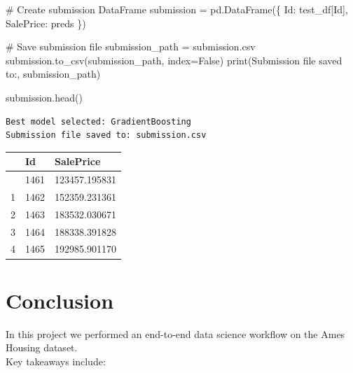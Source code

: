 \documentclass[
]{article}
\newenvironment{Shaded}{\begin{snugshade}}{\end{snugshade}}
\newcommand{\BuiltInTok}[1]{\textcolor[rgb]{0.00,0.23,0.31}{#1}}
\newcommand{\CommentTok}[1]{\textcolor[rgb]{0.37,0.37,0.37}{#1}}
\newcommand{\NormalTok}[1]{\textcolor[rgb]{0.00,0.23,0.31}{#1}}
\newcommand{\OperatorTok}[1]{\textcolor[rgb]{0.37,0.37,0.37}{#1}}
\newcommand{\StringTok}[1]{\textcolor[rgb]{0.13,0.47,0.30}{#1}}
\newcommand{\VariableTok}[1]{\textcolor[rgb]{0.07,0.07,0.07}{#1}}
\begin{document}
\begin{Shaded}
\begin{Highlighting}[]
\CommentTok{\# Create submission DataFrame}
\NormalTok{submission }\OperatorTok{=}\NormalTok{ pd.DataFrame(\{}
    \StringTok{\textquotesingle{}Id\textquotesingle{}}\NormalTok{: test\_df[}\StringTok{\textquotesingle{}Id\textquotesingle{}}\NormalTok{],}
    \StringTok{\textquotesingle{}SalePrice\textquotesingle{}}\NormalTok{: preds}
\NormalTok{\})}

\CommentTok{\# Save submission file}
\NormalTok{submission\_path }\OperatorTok{=} \StringTok{\textquotesingle{}submission.csv\textquotesingle{}}
\NormalTok{submission.to\_csv(submission\_path, index}\OperatorTok{=}\VariableTok{False}\NormalTok{)}
\BuiltInTok{print}\NormalTok{(}\StringTok{\textquotesingle{}Submission file saved to:\textquotesingle{}}\NormalTok{, submission\_path)}

\NormalTok{submission.head()}
\end{Highlighting}
\end{Shaded}

\begin{verbatim}
Best model selected: GradientBoosting
Submission file saved to: submission.csv
\end{verbatim}

\begin{longtable}[]{@{}lll@{}}
\toprule\noalign{}
& Id & SalePrice \\
\midrule\noalign{}
\endhead
\bottomrule\noalign{}
\endlastfoot
0 & 1461 & 123457.195831 \\
1 & 1462 & 152359.231361 \\
2 & 1463 & 183532.030671 \\
3 & 1464 & 188338.391828 \\
4 & 1465 & 192985.901170 \\
\end{longtable}

\section{Conclusion}\label{conclusion}

In this project we performed an end-to-end data science workflow on the
Ames Housing dataset.\\
Key takeaways include:
\end{document}
